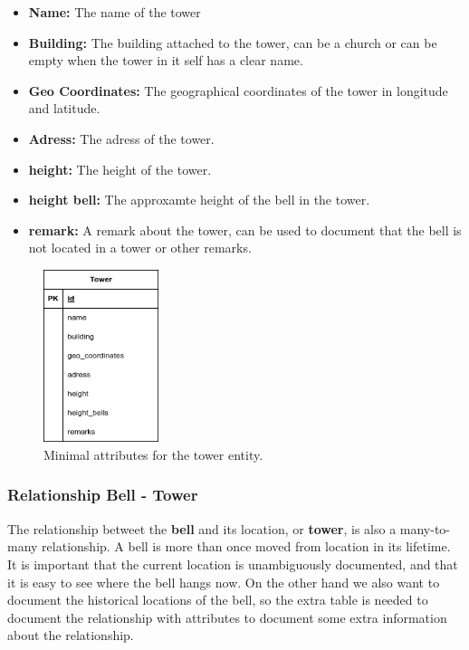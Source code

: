 \documentclass[11pt, a4paper]{article}
\begin{document}
\begin{itemize}
    \item \textbf{Name:} The name of the tower
    \item \textbf{Building:} The building attached to the tower, can be a church or can be empty when the tower in it self has a clear name.
    \item \textbf{Geo Coordinates:} The geographical coordinates of the tower in longitude and latitude.
    \item \textbf{Adress:} The adress of the tower.
    \item \textbf{height:} The height of the tower.
    \item \textbf{height bell:} The approxamte height of the bell in the tower.
    \item \textbf{remark:} A remark about the tower, can be used to document that the bell is not located in a tower or other remarks.
\end{itemize}

\begin{figure}[h!]
    \centering
    \includegraphics[width=0.3\textwidth]{images/tower.png}
    \caption{Minimal attributes for the tower entity.}
    \label{fig:tower-entity}
\end{figure}

\subsubsection{Relationship Bell - Tower}

The relationship betweet the \textbf{bell} and its location, or \textbf{tower}, is also a many-to-many relationship. A bell is more than once moved from location in its lifetime. It is important that the current location is unambiguously documented, and that it is easy to see where the bell hangs now. On the other hand we also want to document the historical locations of the bell, so the extra table is needed to document the relationship with attributes to document some extra information about the relationship.
\end{document}
